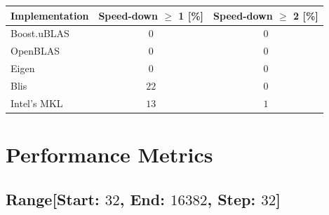 \begin{table}[ht]
    \begin{tabular}{|l|c|c|}
        \hline
        \textbf{Implementation} & \textbf{Speed-down $\geq$ 1 [\%]} & \textbf{Speed-down $\geq$ 2 [\%]}\\
        \hline
        Boost.uBLAS & $0$ & $0$ \\
        \hline
        OpenBLAS    & $0$ & $0$ \\
        \hline
        Eigen       & $0$ & $0$ \\
        \hline
        Blis        & $22$ & $0$ \\
        \hline
        Intel's MKL & $13$ & $1$ \\
        \hline
    \end{tabular}
\end{table}

\clearpage
\section{Performance Metrics}

\subsection*{Range[Start: $32$, End: $16382$, Step: $32$]}

